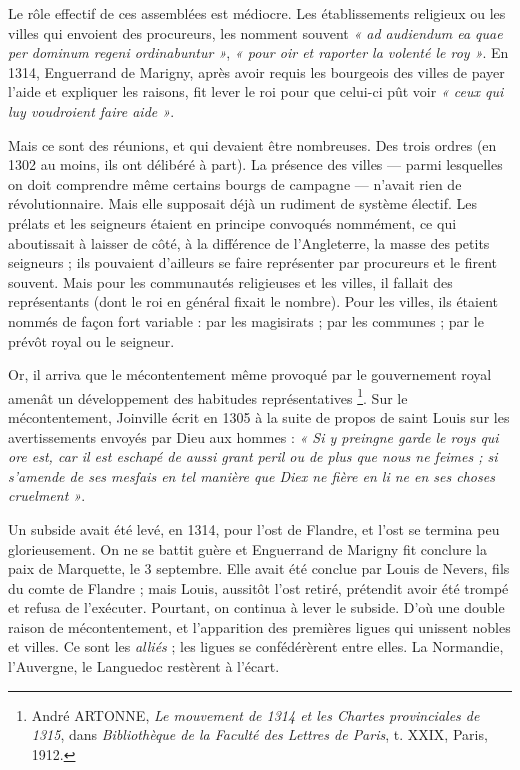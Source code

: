 \documentclass[french,twoside]{book} %
\newcommand{\labelchar}[1]{{\color{rubric}\bf #1}}
\begin{document}
\begin{listalpha}[itemsep=0pt,]
\item[] \hspace{-1.5em}{\bfseries Quelques remarques :}
\item Le rôle effectif de ces assemblées est médiocre. Les établissements religieux ou les villes qui envoient des procureurs, les nomment souvent \emph{« ad audiendum ea quae per dominum regeni ordinabuntur »}, \emph{« pour oir et raporter la volenté le roy »}. En 1314, Enguerrand de Marigny, après avoir requis les bourgeois des villes de payer l’aide et expliquer les raisons, fit lever le roi pour que celui-ci pût voir \emph{« ceux qui luy voudroient faire aide »}.
\item Mais ce sont des réunions, et qui devaient être nombreuses. Des trois ordres (en 1302 au moins, ils ont délibéré à part). La présence des villes — parmi lesquelles on doit comprendre même certains bourgs de campagne — n’avait rien de révolutionnaire. Mais elle supposait déjà un rudiment de système électif. Les prélats et les seigneurs étaient en principe convoqués nommément, ce qui aboutissait à laisser de côté, à la différence de l’Angleterre, la masse des petits seigneurs ; ils pouvaient d’ailleurs se faire représenter par procureurs et le firent souvent. Mais pour les communautés religieuses et les villes, il fallait des représentants (dont le roi en général fixait le nombre). Pour les villes, ils étaient nommés de façon fort variable : par les magisirats ; par les communes ; par le prévôt royal ou le seigneur.

\end{listalpha}\bigbreak
\noindent \labelchar{4)} Or, il arriva que le mécontentement même provoqué par le gouvernement royal amenât un développement des habitudes représentatives \footnote{ André ARTONNE, {\itshape Le mouvement de 1314 et les Chartes provinciales de 1315}, dans {\itshape Bibliothèque de la Faculté des Lettres de Paris}, t. XXIX, Paris, 1912.}. Sur le mécontentement, Joinville écrit en 1305 à la suite de propos de saint Louis sur les avertissements envoyés par Dieu aux hommes : \emph{« Si y preingne garde le roys qui ore est, car il est eschapé de aussi grant peril ou de plus que nous ne feimes ; si s’amende de ses mesfais en tel manière que Diex ne fière en li ne en ses choses cruelment »}.\par
Un subside avait été levé, en 1314, pour l’ost de Flandre, et l’ost se termina peu glorieusement. On ne se battit guère et Enguerrand de Marigny fit conclure la paix de Marquette, le 3 septembre. Elle avait été conclue par Louis de Nevers, fils du comte de Flandre ; mais Louis, aussitôt l’ost retiré, prétendit avoir été trompé et refusa de l’exécuter. Pourtant, on continua à lever le subside. D’où une double raison de mécontentement, et l’apparition des premières ligues qui unissent nobles et villes. Ce sont les \emph{alliés} ; les ligues se confédérèrent entre elles. La Normandie, l’Auvergne, le Languedoc restèrent à l’écart.\par
\end{document}
